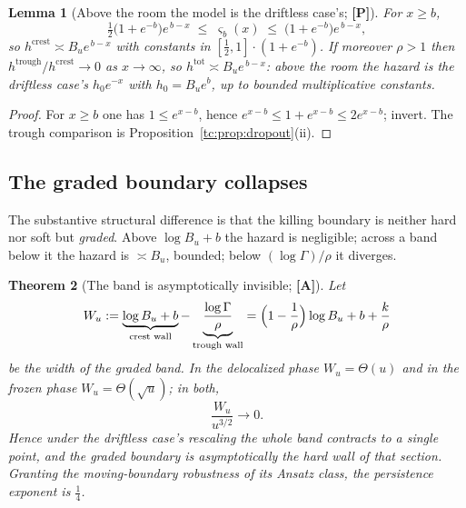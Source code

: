 \documentclass[11pt]{article}
\numberwithin{equation}{section}
\theoremstyle{plain}
\newtheorem{theorem}{Theorem}[section]
\newtheorem{lemma}[theorem]{Lemma}
\theoremstyle{definition}
\theoremstyle{remark}
\begin{document}
\begin{lemma}[Above the room the model is the driftless case's; \textbf{[P]}]
\label{tc:lem:aboveroom}
For $x\ge b$,
\begin{equation}\label{tc:eq:sandwich}
\tfrac12\bigl(1+e^{-b}\bigr)e^{\,b-x}\;\le\;\varsigma_b(x)\;\le\;
\bigl(1+e^{-b}\bigr)e^{\,b-x},
\end{equation}
so $h^{\mathrm{crest}}\asymp B_ue^{\,b-x}$ with constants in
$[\tfrac12,1]\cdot(1+e^{-b})$. If moreover $\rho>1$ then
$h^{\mathrm{trough}}/h^{\mathrm{crest}}\to0$ as $x\to\infty$, so
$h^{\mathrm{tot}}\asymp B_ue^{\,b-x}$: above the room the hazard is
the driftless case's $h_{0}e^{-x}$ with $h_{0}=B_ue^{b}$, up to bounded
multiplicative constants.
\end{lemma}

\begin{proof}
For $x\ge b$ one has $1\le e^{x-b}$, hence
$e^{x-b}\le1+e^{x-b}\le2e^{x-b}$; invert. The trough comparison is
Proposition~\ref{tc:prop:dropout}(ii).
\end{proof}

\subsection{The graded boundary collapses}\label{tc:subsub:collapse}

The substantive structural difference is that the killing boundary is
neither hard nor soft but \emph{graded}. Above $\log B_u+b$ the hazard
is negligible; across a band below it the hazard is $\asymp B_u$,
bounded; below $(\log\Gamma)/\rho$ it diverges.

\begin{theorem}[The band is asymptotically invisible; \textbf{[A]}]
\label{tc:thm:collapse}
Let
\begin{equation}\label{tc:eq:band}
W_u:=\underbrace{\log B_u+b}_{\text{crest wall}}
-\underbrace{\frac{\log\Gamma}{\rho}}_{\text{trough wall}}
=\Bigl(1-\frac1\rho\Bigr)\log B_u+b+\frac{k}{\rho}
\end{equation}
be the width of the graded band. In the delocalized phase
$W_u=\Theta(u)$ and in the frozen phase $W_u=\Theta(\sqrt u)$; in both,
\[
\frac{W_u}{u^{3/2}}\longrightarrow0 .
\]
Hence under the driftless case's rescaling the whole band contracts to a single
point, and the graded boundary is asymptotically the hard wall of that
section. Granting the moving-boundary robustness of its Ansatz class,
the persistence exponent is $\tfrac14$.
\end{theorem}
\end{document}
